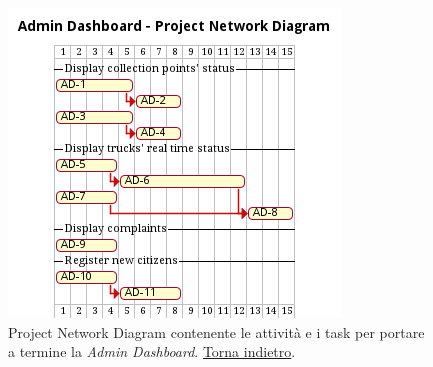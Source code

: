 \begin{figure}[H]
    \centering
    \includegraphics[width=\textwidth]{../img/gantt-admin-dashboard.pm}
    \caption{Project Network Diagram contenente le attività e i task per portare a termine la \textit{Admin Dashboard}. \hyperlink{back:gantt-admin-dashboard}{Torna indietro}.}
    \label{fig:gantt-admin-dashboard}
\end{figure}

